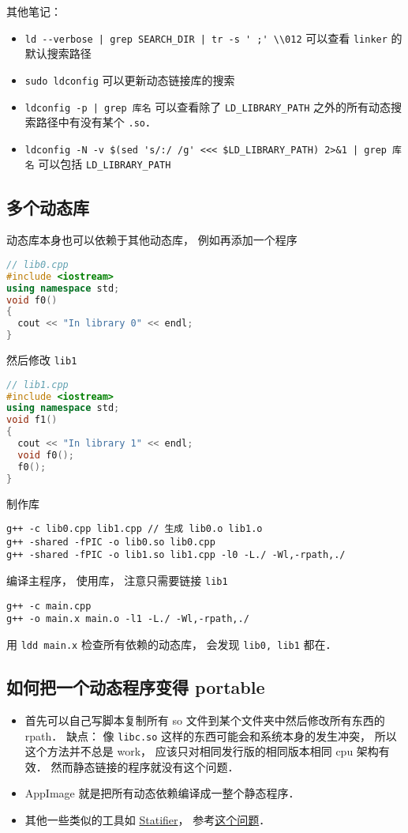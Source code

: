 其他笔记：
\begin{itemize}
\item \verb`ld --verbose | grep SEARCH_DIR | tr -s ' ;' \\012` 可以查看 \verb|linker| 的默认搜索路径
\item \verb|sudo ldconfig| 可以更新动态链接库的搜索
\item \verb`ldconfig -p | grep 库名` 可以查看除了 \verb|LD_LIBRARY_PATH| 之外的所有动态搜索路径中有没有某个 \verb|.so|．
\item \verb`ldconfig -N -v $(sed 's/:/ /g' <<< $LD_LIBRARY_PATH) 2>&1 | grep 库名` 可以包括 \verb|LD_LIBRARY_PATH|
\end{itemize}

\subsection{多个动态库}
动态库本身也可以依赖于其他动态库， 例如再添加一个程序
\begin{lstlisting}[language=cpp]
// lib0.cpp
#include <iostream>
using namespace std;
void f0()
{
  cout << "In library 0" << endl;
}
\end{lstlisting}
然后修改 \verb|lib1|
\begin{lstlisting}[language=cpp]
// lib1.cpp
#include <iostream>
using namespace std;
void f1()
{
  cout << "In library 1" << endl;
  void f0();
  f0();
}
\end{lstlisting}
制作库
\begin{lstlisting}[language=none]
g++ -c lib0.cpp lib1.cpp // 生成 lib0.o lib1.o
g++ -shared -fPIC -o lib0.so lib0.cpp
g++ -shared -fPIC -o lib1.so lib1.cpp -l0 -L./ -Wl,-rpath,./
\end{lstlisting}
编译主程序， 使用库， 注意只需要链接 \verb|lib1|
\begin{lstlisting}[language=none]
g++ -c main.cpp
g++ -o main.x main.o -l1 -L./ -Wl,-rpath,./
\end{lstlisting}
用 \verb|ldd main.x| 检查所有依赖的动态库， 会发现 \verb|lib0, lib1| 都在．

\subsection{如何把一个动态程序变得 portable}
\begin{itemize}
\item 首先可以自己写脚本复制所有 so 文件到某个文件夹中然后修改所有东西的 rpath． 缺点： 像 \verb|libc.so| 这样的东西可能会和系统本身的发生冲突， 所以这个方法并不总是 work， 应该只对相同发行版的相同版本相同 cpu 架构有效． 然而静态链接的程序就没有这个问题．
\item AppImage 就是把所有动态依赖编译成一整个静态程序．
\item 其他一些类似的工具如 \href{https://statifier.sourceforge.net/}{Statifier}， 参考\href{https://askubuntu.com/questions/537479/is-there-any-open-source-way-to-make-a-static-from-a-dynamic-executable-with-no}{这个问题}．
\end{itemize}
